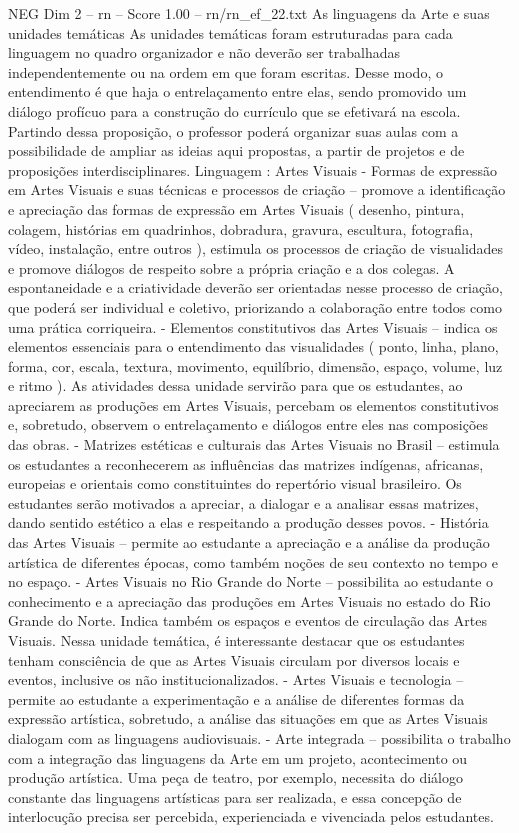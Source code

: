 \begin{textsample}{NEG Dim 2 – rn – Score 1.00 – rn/rn\_ef\_22.txt}  \label{ex:f2_neg_050}
As linguagens da Arte e suas unidades temáticas As unidades temáticas foram estruturadas para cada linguagem no quadro organizador e não deverão ser trabalhadas independentemente ou na ordem em que foram escritas.
Desse modo, o entendimento é que haja o entrelaçamento entre elas, sendo promovido um diálogo profícuo para a construção do currículo que se efetivará na escola.
Partindo dessa proposição, o professor poderá organizar suas aulas com a possibilidade de ampliar as ideias aqui propostas, a partir de projetos e de proposições interdisciplinares.
Linguagem : Artes Visuais - Formas de expressão em Artes Visuais e suas técnicas e processos de criação – promove a identificação e apreciação das formas de expressão em Artes Visuais ( desenho, pintura, colagem, histórias em quadrinhos, dobradura, gravura, escultura, fotografia, vídeo, instalação, entre outros ), estimula os processos de criação de visualidades e promove diálogos de respeito sobre a própria criação e a dos colegas.
A espontaneidade e a criatividade deverão ser orientadas nesse processo de criação, que poderá ser individual e coletivo, priorizando a colaboração entre todos como uma prática corriqueira. - Elementos constitutivos das Artes Visuais – indica os elementos essenciais para o entendimento das visualidades ( ponto, linha, plano, forma, cor, escala, textura, movimento, equilíbrio, dimensão, espaço, volume, luz e ritmo ).
As atividades dessa unidade servirão para que os estudantes, ao apreciarem as produções em Artes Visuais, percebam os elementos constitutivos e, sobretudo, observem o entrelaçamento e diálogos entre eles nas composições das obras. - Matrizes estéticas e culturais das Artes Visuais no Brasil – estimula os estudantes a reconhecerem as influências das matrizes indígenas, africanas, europeias e orientais como constituintes do repertório visual brasileiro.
Os estudantes serão motivados a apreciar, a dialogar e a analisar essas matrizes, dando sentido estético a elas e respeitando a produção desses povos. - História das Artes Visuais – permite ao estudante a apreciação e a análise da produção artística de diferentes épocas, como também noções de seu contexto no tempo e no espaço. - Artes Visuais no Rio Grande do Norte – possibilita ao estudante o conhecimento e a apreciação das produções em Artes Visuais no estado do Rio Grande do Norte.
Indica também os espaços e eventos de circulação das Artes Visuais.
Nessa unidade temática, é interessante destacar que os estudantes tenham consciência de que as Artes Visuais circulam por diversos locais e eventos, inclusive os não institucionalizados. - Artes Visuais e tecnologia – permite ao estudante a experimentação e a análise de diferentes formas da expressão artística, sobretudo, a análise das situações em que as Artes Visuais dialogam com as linguagens audiovisuais. - Arte integrada – possibilita o trabalho com a integração das linguagens da Arte em um projeto, acontecimento ou produção artística.
Uma peça de teatro, por exemplo, necessita do diálogo constante das linguagens artísticas para ser realizada, e essa concepção de interlocução precisa ser percebida, experienciada e vivenciada pelos estudantes.

\end{textsample}
